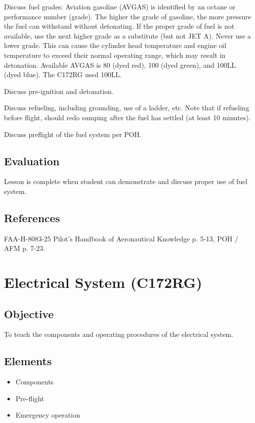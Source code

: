 \documentclass[twoside,openright]{report}
\begin{document}
Discuss fuel grades: Aviation gasoline (AVGAS) is identified by an octane or
performance number (grade). The higher the grade of gasoline, the more pressure
the fuel can withstand without detonating. If the proper grade of fuel is not
available, use the next higher grade as a substitute (but not JET A). Never use
a lower grade. This can cause the cylinder head temperature and engine oil
temperature to exceed their normal operating range, which may result in
detonation. Available AVGAS is 80 (dyed red), 100 (dyed green), and 100LL (dyed
blue). The C172RG used 100LL.

Discuss pre-ignition and detonation.

Discuss refueling, including grounding, use of a ladder, etc. Note that if
refueling before flight, should redo sumping after the fuel has settled (at
least 10 minutes).

Discuss preflight of the fuel system per POH.

\section{Evaluation}

Lesson is complete when student can demonstrate and discuss proper use of fuel
system.

\section{References}

FAA-H-8083-25 Pilot's Handbook of Aeronautical Knowledge p. 5-13, POH / AFM p.
7-23.

\chapter{Electrical System (C172RG)}

\section{Objective}

To teach the components and operating procedures of the electrical system.

\section{Elements}

\begin{itemize}
  \item Components
  \item Pre-flight
  \item Emergency operation
\end{itemize}
\end{document}
